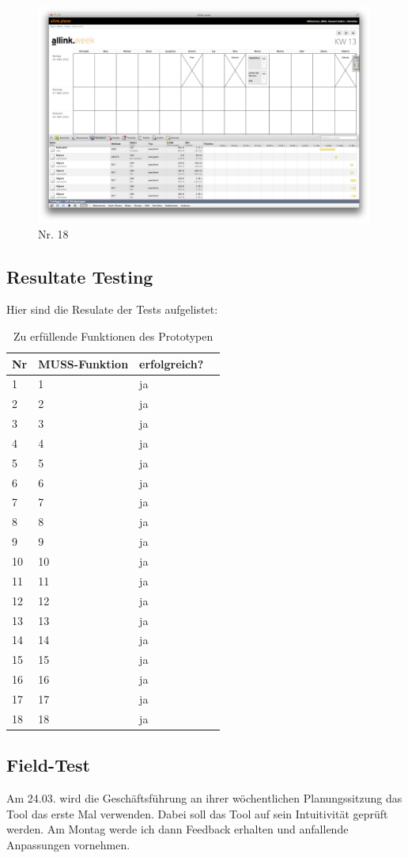 \begin{figure}[htbp]
    \centering
        \includegraphics[width=0.99\textwidth,angle=0]{bilder/testing/tasks_sortieren.png}
    \caption{Nr. 18}
    \label{fig:bilder_testing_tasks_sortieren}
\end{figure}
\clearpage
\subsection{Resultate Testing}
Hier sind die Resulate der Tests aufgelistet:
\begin{table}[!ht]
\begin{center}
    \begin{tabular}{llp{8cm}l}
        \toprule Nr & MUSS-Funktion & erfolgreich? \\
        \midrule 1 & 1 & ja\\
        \midrule 2 & 2 & ja\\
        \midrule 3 & 3 & ja\\
        \midrule 4 & 4 & ja\\
        \midrule 5 & 5 & ja\\
        \midrule 6 & 6 & ja\\
        \midrule 7 & 7 & ja\\
        \midrule 8 & 8 & ja\\
        \midrule 9 & 9 & ja\\
        \midrule 10 & 10 & ja\\
        \midrule 11 & 11 & ja\\
        \midrule 12 & 12 & ja\\
        \midrule 13 & 13 & ja\\
        \midrule 14 & 14 & ja\\
        \midrule 15 & 15 & ja\\
        \midrule 16 & 16 & ja\\
        \midrule 17 & 17 & ja\\
        \midrule 18 & 18 & ja\\
        \bottomrule
    \end{tabular}
    \caption{Zu erfüllende Funktionen des Prototypen}
    \label{tab:testing_muss_funktionen_ziele}
\end{center}
\end{table}
\subsection{Field-Test}
Am 24.03. wird die Geschäftsführung an ihrer wöchentlichen Planungssitzung das Tool das erste Mal verwenden.
Dabei soll das Tool auf sein Intuitivität geprüft werden. Am Montag werde ich dann Feedback erhalten und anfallende Anpassungen vornehmen.
